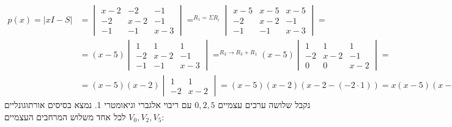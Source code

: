 \documentclass{article}
\DeclareMathOperator*{\equals}{=}
\begin{document}
\begin{align*}
    p(x)=|xI-S| & =\begin{vmatrix}
                       x-2 & -2  & -1  \\
                       -2  & x-2 & -1  \\
                       -1  & -1  & x-3
                   \end{vmatrix} \equals^{R_1=\Sigma R_i}
    \begin{vmatrix}
        x-5 & x-5 & x-5 \\
        -2  & x-2 & -1  \\
        -1  & -1  & x-3
    \end{vmatrix} =                                                                   \\
                & = (x-5)\begin{vmatrix}
                             1  & 1   & 1   \\
                             -2 & x-2 & -1  \\
                             -1 & -1  & x-3
                         \end{vmatrix} \equals^{R_3\rightarrow R_3+R_1}
    (x-5)\begin{vmatrix}
             1  & 1   & 1   \\
             -2 & x-2 & -1  \\
             0  & 0   & x-2
         \end{vmatrix} =                                                              \\
                & = (x-5)(x-2)\begin{vmatrix}
                                  1  & 1   \\
                                  -2 & x-2
                              \end{vmatrix} = (x-5)(x-2)(x-2-(-2\cdot 1))=x(x-5)(x-2)
\end{align*}
נקבל שלושה ערכים עצמיים $0, 2, 5$ עם ריבוי אלגברי וגיאומטרי 1. נמצא בסיסים אורתוגונליים לכל אחד משלוש המרחבים העצמיים $V_0, V_2, V_5$:
\end{document}
